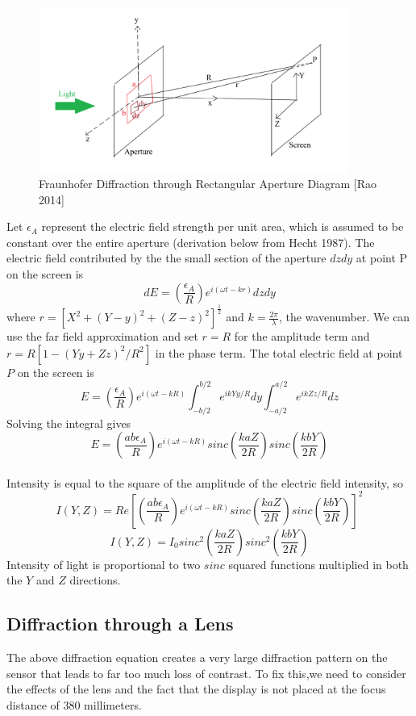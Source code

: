 \begin{figure}[ht]
  \centering
  \includegraphics[width=4in]{chapters/chapter8/images/Rectangular_Aperture.png}
  \caption{Fraunhofer Diffraction through Rectangular Aperture Diagram [Rao 2014]}
  \label{fig:ferrari}
\end{figure}

Let $\epsilon_A$ represent the electric field strength per unit area, which is assumed to be constant over the entire aperture (derivation below from Hecht 1987). The electric field contributed by the the small section of the aperture $dzdy$ at point P on the screen is 
$$dE = \left(\frac{\epsilon_A}{R} \right)e^{i(\omega t-kr)}dzdy$$
where $r = [X^2 + (Y-y)^2+(Z-z)^2]^{\frac{1}{2}}$ and $k = \frac{2 \pi}{\lambda}$, the wavenumber. We can use the far field approximation and set $r = R$ for the amplitude term and $r = R[1-(Yy+Zz)^2/{R^2}]$ in the phase term. The total electric field at point $P$ on the screen is \\
$$E = \left(\frac{\epsilon_{A}}{R}\right)e^{i(\omega t-kR)} \int_{-b/2}^{b/2} e^{ikYy/R}dy \int_{-a/2}^{a/2} e^{ikZz/R} dz $$
Solving the integral gives \\
$$E = \left(\frac{ab\epsilon_A}{R}\right) e^{i(\omega t-kR)} sinc\left(\frac{kaZ}{2R}\right)sinc\left(\frac{kbY}{2R}\right) $$ \\
Intensity is equal to the square of the amplitude of the electric field intensity, so \\
$$I(Y,Z) = Re\left[\left(\frac{ab\epsilon_A}{R}\right)e^{i(\omega t - kR)} sinc\left(\frac{kaZ}{2R}\right) sinc\left(\frac{kbY}{2R}\right)\right]^2$$
$$I(Y,Z) = I_0  sinc^2\left(\frac{kaZ}{2R}\right) sinc^2\left(\frac{kbY}{2R}\right)$$
Intensity of light is proportional to two $sinc$ squared functions multiplied in both the $Y$ and $Z$ directions.


\subsection{Diffraction through a Lens}
The above diffraction equation creates a very large diffraction pattern on the sensor that leads to far too much loss of contrast. To fix this,we need to consider the effects of the lens and the fact that the display is not placed at the focus distance of 380 millimeters. 

